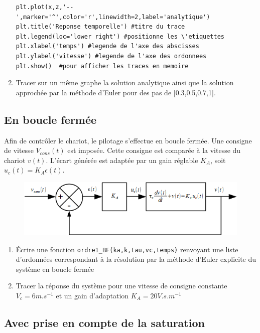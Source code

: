 \documentclass[10pt]{article}
\begin{document}
\begin{enumerate}
\begin{verbatim}
plt.plot(x,z,'--',marker='^',color='r',linewidth=2,label='analytique')  
plt.title('Reponse temporelle') #titre du trace
plt.legend(loc='lower right') #positionne les \'etiquettes
plt.xlabel('temps') #legende de l'axe des abscisses
plt.ylabel('vitesse') #legende de l'axe des ordonnees
plt.show()  #pour afficher les traces en memoire
\end{verbatim}

\item Tracer sur un m\^eme graphe la solution analytique ainsi que la solution approch\'ee par la m\'ethode d'Euler pour des pas de [0.3,0.5,0.7,1].

\end{enumerate}


\subsection{En boucle ferm\'ee}
Afin de contr\^oler le chariot, le pilotage s'effectue en boucle ferm\'ee. Une consigne de vitesse $V_{cons}(t)$ est impos\'ee. Cette consigne est compar\'ee \`a la vitesse du chariot $v(t)$. L'\'ecart g\'en\'er\'ee est adapt\'ee par un gain r\'eglable $K_A$, soit $u_c(t)=K_A\epsilon(t)$.


\begin{figure}[!hbt]
\begin{center}
\includegraphics[width=12cm]{images/BF.png}
\end{center}
\end{figure}


\begin{enumerate}
\item \'Ecrire une fonction {\tt ordre1\_BF(ka,k,tau,vc,temps)} renvoyant une liste d'ordonn\'ees correspondant \`a la r\'esolution par la m\'ethode d'Euler explicite du syst\`eme en boucle ferm\'ee
\item Tracer la r\'eponse du syst\`eme pour une vitesse de consigne constante $V_c=6m.s^{-1}$ et un gain d'adaptation $K_A=20 V.s.m^{-1}$
\end{enumerate}


\subsection{Avec prise en compte de la saturation}
\end{document}
